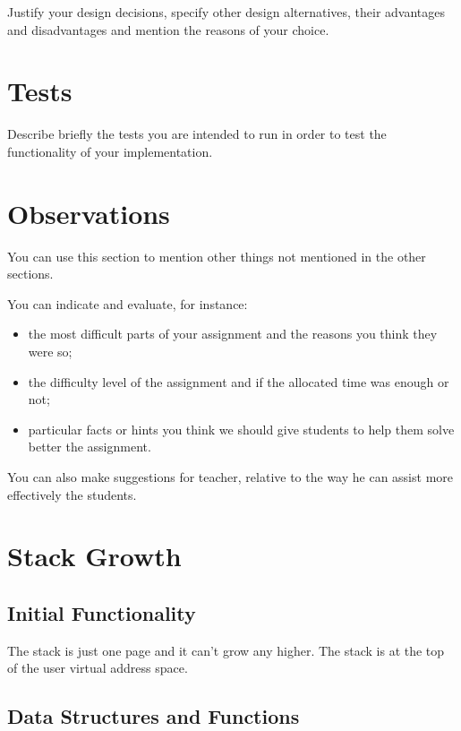 Justify your design decisions, specify other design alternatives, their advantages and disadvantages and mention the reasons of your choice.  

\section{Tests}

Describe briefly the tests you are intended to run in order to test the functionality of your implementation.

\section{Observations}

You can use this section to mention other things not mentioned in the other sections. 

You can indicate and evaluate, for instance:
\begin{itemize}
	\item the most difficult parts of your assignment and the reasons you think they were so; 
	
	\item the difficulty level of the assignment and if the allocated time was enough or not; 

	\item particular facts or hints you think we should give students to help them solve better the assignment.

\end{itemize}

You can also make suggestions for teacher, relative to the way he can assist more effectively the students.

\section{Stack Growth}
\subsection{Initial Functionality}

The stack is just one page and it can't grow any higher. The stack is at the top of the user
virtual address space.

\subsection{Data Structures and Functions}

